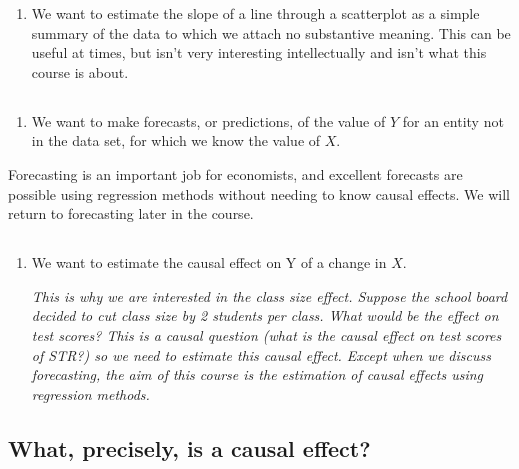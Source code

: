 \documentclass[
  letterpaper,
  DIV=11,
  numbers=noendperiod]{scrartcl}
\providecommand{\tightlist}{%
  \setlength{\itemsep}{0pt}\setlength{\parskip}{0pt}}\usepackage{longtable,booktabs,array}
\begin{document}
\begin{enumerate}
\def\labelenumi{\arabic{enumi}.}
\tightlist
\item
  We want to estimate the slope of a line through a scatterplot as a
  simple summary of the data to which we attach no substantive meaning.
  This can be useful at times, but isn't very interesting intellectually
  and isn't what this course is about.
\end{enumerate}

\hypertarget{section-5}{%
\subsection{}\label{section-5}}

\begin{enumerate}
\def\labelenumi{\arabic{enumi}.}
\setcounter{enumi}{1}
\tightlist
\item
  We want to make forecasts, or predictions, of the value of \(Y\) for
  an entity not in the data set, for which we know the value of \(X\).
\end{enumerate}

Forecasting is an important job for economists, and excellent forecasts
are possible using regression methods without needing to know causal
effects. We will return to forecasting later in the course.

\hypertarget{section-6}{%
\subsection{}\label{section-6}}

\begin{enumerate}
\def\labelenumi{\arabic{enumi}.}
\setcounter{enumi}{2}
\item
  We want to estimate the causal effect on Y of a change in \(X\).

  \emph{This is why we are interested in the class size effect. Suppose
  the school board decided to cut class size by 2 students per class.
  What would be the effect on test scores? This is a causal question
  (what is the causal effect on test scores of STR?) so we need to
  estimate this causal effect. Except when we discuss forecasting, the
  aim of this course is the estimation of causal effects using
  regression methods.}
\end{enumerate}

\hypertarget{what-precisely-is-a-causal-effect}{%
\subsection{What, precisely, is a causal
effect?}\label{what-precisely-is-a-causal-effect}}
\end{document}
